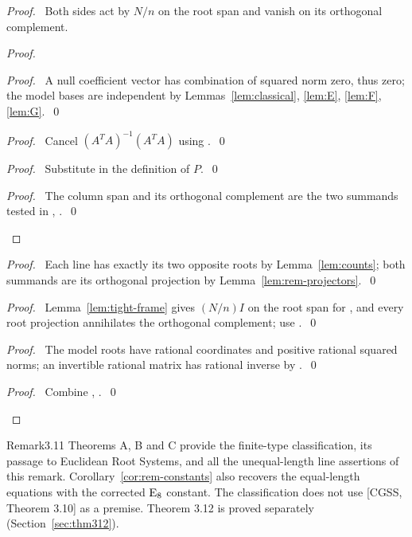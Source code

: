 \begin{proof}
\pfsketch\ Both sides act by $N/n$ on the root span and vanish on its
orthogonal complement.
\begin{proof}
\begin{proof}\pf\ A null coefficient vector has combination of squared
norm zero, thus zero; the model bases are independent by
Lemmas~\ref{lem:classical}, \ref{lem:E}, \ref{lem:F}, \ref{lem:G}.~\qed\end{proof}
\begin{proof}\pf\ Cancel $(A^TA)^{-1}(A^TA)$ using .~\qed\end{proof}
\begin{proof}\pf\ Substitute in the definition of $P$.~\qed\end{proof}
\qedstep
\begin{proof}\pf\ The column span and its orthogonal complement are
the two summands tested in , .~\qed\end{proof}
\end{proof}
\begin{proof}\pf\ Each line has exactly its two opposite roots by
Lemma~\ref{lem:counts}; both summands are its orthogonal projection by
Lemma~\ref{lem:rem-projectors}.~\qed\end{proof}
\begin{proof}\pf\ Lemma~\ref{lem:tight-frame} gives $(N/n)I$ on the
root span for , and every root projection annihilates
the orthogonal complement; use .~\qed\end{proof}
\begin{proof}\pf\ The model roots have rational coordinates and
positive rational squared norms; an invertible rational matrix has
rational inverse by .~\qed\end{proof}
\qedstep
\begin{proof}\pf\ Combine , .~\qed\end{proof}
\end{proof}

\begin{cgss}{Remark}{3.11}\label{rem:3.11}
Theorems A, B and C provide the finite-type classification, its passage
to Euclidean Root Systems, and all the unequal-length line assertions
of this remark. Corollary~\ref{cor:rem-constants} also recovers the
equal-length equations with the corrected $\mathrm{E}_8$ constant.
The classification does not use [CGSS, Theorem 3.10] as a premise.
Theorem 3.12 is proved separately (Section~\ref{sec:thm312}).
\end{cgss}
\endgroup
